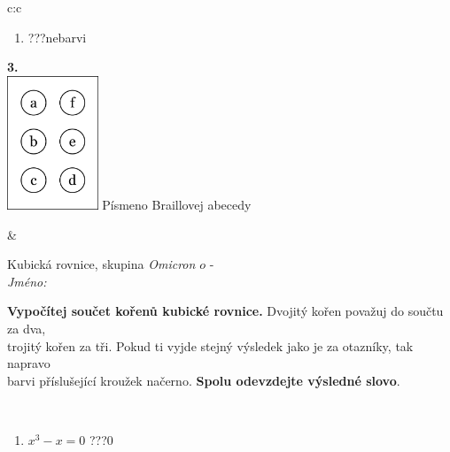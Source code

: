 \documentclass[10pt]{report}
\newcommand\omicron{o}
\begin{document}
\begin{tabular}{c:c}
\begin{minipage}[c][104.5mm][t]{0.5\linewidth}
\begin{center}
\begin{minipage}{0.79\linewidth}
\begin{center}
\begin{varwidth}{\linewidth}
\begin{enumerate}
\item \quad \dotfill\; ???\;\dotfill \quad nebarvi
\end{enumerate}
\end{varwidth}
\end{center}
\end{minipage}
\begin{minipage}{0.20\linewidth}
\begin{center}
{\Huge\bfseries 3.} \\[2mm]
\includegraphics[height=40mm]{../images/braille.png}
{\small Písmeno Braillovej abecedy}
\end{center}
\end{minipage}
\end{center}
\end{minipage}
&
\begin{minipage}[c][104.5mm][t]{0.5\linewidth}
\begin{center}
\vspace{7mm}
{\huge Kubická rovnice, skupina \textit{Omicron $\omicron$} -}\\[5mm]
\textit{Jméno:}\phantom{xxxxxxxxxxxxxxxxxxxxxxxxxxxxxxxxxxxxxxxxxxxxxxxxxxxxxxxxxxxxxxxxx}\\[5mm]
\begin{minipage}{0.95\linewidth}
\begin{center}
\textbf{Vypočítej součet kořenů kubické rovnice.} Dvojitý kořen považuj do součtu za dva,\\trojitý kořen za tři. Pokud ti vyjde stejný výsledek jako je za otazníky, tak napravo\\barvi příslušející kroužek načerno. \textbf{Spolu odevzdejte výsledné slovo}.
\end{center}
\end{minipage}
\\[1mm]
\begin{minipage}{0.79\linewidth}
\begin{center}
\begin{varwidth}{\linewidth}
\begin{enumerate}
\Large
\item $x^3-x=0$\quad \dotfill\; ???\;\dotfill \quad $0$

\end{enumerate}
\end{varwidth}
\end{center}
\end{minipage}
\end{center}
\end{minipage}
\end{tabular}
\end{document}
